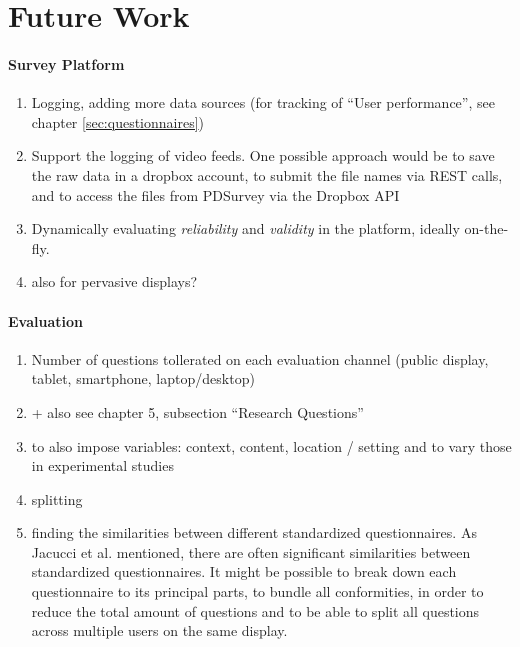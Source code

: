 
\section{Future Work}
\label{chapter:future-work}

	

\paragraph{Survey Platform}

	\begin{enumerate}
	\item Logging, adding more data sources (for tracking of ``User performance'', see chapter \ref{sec:questionnaires})
	\item Support the logging of video feeds. One possible approach would be to save the raw data in a dropbox account, to submit the file names via REST calls, and to access the files from PDSurvey via the Dropbox API
	\item Dynamically evaluating \textit{reliability} and \textit{validity} in the platform, ideally on-the-fly.
	\item also for pervasive displays?
	\end{enumerate}


\paragraph{Evaluation}

	\begin{enumerate}
	\item Number of questions tollerated on each evaluation channel (public display, tablet, smartphone, laptop/desktop)
	\item + also see chapter 5, subsection ``Research Questions'' 
	\item to also impose variables: context, content, location / setting and to vary those in experimental studies
	\item splitting 
	\item finding the similarities between different standardized questionnaires. As Jacucci et al. \cite{jacucci2010worldsofinformation} mentioned, there are often significant similarities between standardized questionnaires. It might be possible to break down each questionnaire to its principal parts, to bundle all conformities, in order to reduce the total amount of questions and to be able to split all questions across multiple users on the same display.
	\end{enumerate}


